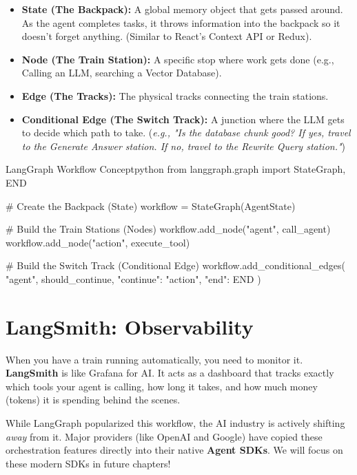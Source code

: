 \documentclass[12pt,a4paper,oneside]{book}
\begin{document}
\begin{itemize}
	\item \textbf{State (The Backpack):} A global memory object that gets passed around. As the agent completes tasks, it throws information into the backpack so it doesn't forget anything. (Similar to React's Context API or Redux).
	\item \textbf{Node (The Train Station):} A specific stop where work gets done (e.g., Calling an LLM, searching a Vector Database).
	\item \textbf{Edge (The Tracks):} The physical tracks connecting the train stations.
	\item \textbf{Conditional Edge (The Switch Track):} A junction where the LLM gets to decide which path to take. (\textit{e.g., "Is the database chunk good? If yes, travel to the Generate Answer station. If no, travel to the Rewrite Query station."})
\end{itemize}

\begin{codeblock}{LangGraph Workflow Concept}{python}
	from langgraph.graph import StateGraph, END

	# Create the Backpack (State)
	workflow = StateGraph(AgentState)

	# Build the Train Stations (Nodes)
	workflow.add_node("agent", call_agent)
	workflow.add_node("action", execute_tool)

	# Build the Switch Track (Conditional Edge)
	workflow.add_conditional_edges(
	"agent",
	should_continue,
	{
			"continue": "action",
			"end": END
		}
	)
\end{codeblock}

\section{LangSmith: Observability}
When you have a train running automatically, you need to monitor it. \textbf{LangSmith} is like Grafana for AI. It acts as a dashboard that tracks exactly which tools your agent is calling, how long it takes, and how much money (tokens) it is spending behind the scenes.

\begin{tipbox}
	While LangGraph popularized this workflow, the AI industry is actively shifting \textit{away} from it. Major providers (like OpenAI and Google) have copied these orchestration features directly into their native \textbf{Agent SDKs}. We will focus on these modern SDKs in future chapters!
\end{tipbox}
\end{document}
